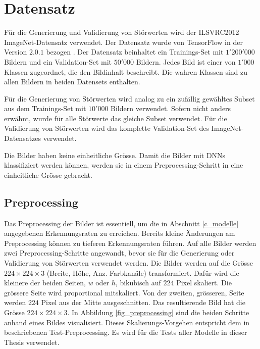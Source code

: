 \documentclass{FFHS_Thesis_Additions/ffhsthesis}
\begin{document}
\pagebreak

\section{Datensatz}

Für die Generierung und Validierung von Störwerten wird der ILSVRC2012 ImageNet-Datensatz \cite{russakovsky_imagenet_2015} verwendet. 
Der Datensatz wurde von TensorFlow in der Version $2.0.1$ bezogen \cite{martin_abadi_tensorflow_2015}. 
Der Datensatz beinhaltet ein Trainings-Set mit $1'200'000$ Bildern und ein Validation-Set mit $50'000$ Bildern. 
Jedes Bild ist einer von $1'000$ Klassen zugeordnet, die den Bildinhalt beschreibt. 
Die wahren Klassen sind zu allen Bildern in beiden Datensets enthalten. 

Für die Generierung von Störwerten wird analog zu \cite{moosavi-dezfooli_universal_2017-1} ein zufällig gewähltes Subset aus dem Trainings-Set mit $10'000$ Bildern verwendet. 
Sofern nicht anders erwähnt, wurde für alle Störwerte das gleiche Subset verwendet. 
Für die Validierung von Störwerten wird das komplette Validation-Set des ImageNet-Datensatzes verwendet. 

Die Bilder haben keine einheitliche Grösse. 
Damit die Bilder mit DNNs klassifiziert werden können, werden sie in einem Preprocessing-Schritt in eine einheitliche Grösse gebracht.


\subsection{Preprocessing}

Das Preprocessing der Bilder ist essentiell, um die in Abschnitt \ref{c_modelle} angegebenen Erkennungsraten zu erreichen. 
Bereits kleine Änderungen am Preprocessing können zu tieferen Erkennungsraten führen. 
Auf alle Bilder werden zwei Preprocessing-Schritte angewandt, bevor sie für die Generierung oder Validierung von Störwerten verwendet werden.
Die Bilder werden auf die Grösse $224 \times 224 \times 3$ (Breite, Höhe, Anz. Farbkanäle) transformiert. 
Dafür wird die kleinere der beiden Seiten, $w$ oder $h$, bikubisch auf $224$ Pixel skaliert. 
Die grössere Seite wird proportional mitskaliert. 
Von der zweiten, grösseren, Seite werden $224$ Pixel aus der Mitte ausgeschnitten. 
Das resultierende Bild hat die Grösse $224 \times 224 \times 3$. 
In Abbildung \ref{fig_preprocessing} sind die beiden Schritte anhand eines Bildes visualisiert. 
Dieses Skalierungs-Vorgehen entspricht dem in \cite{chatfield_return_2014} beschriebenen Test-Preprocessing. Es wird für die Tests aller Modelle in dieser Thesis verwendet. 
\end{document}

